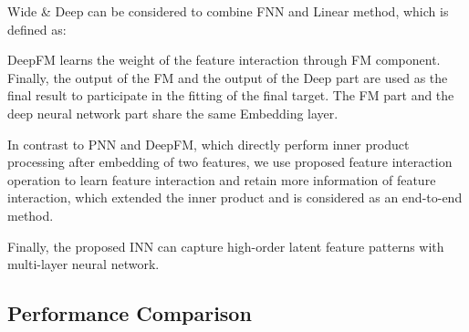 \documentclass[journal]{IEEEtran}
\begin{document}
Wide \& Deep can be considered to combine FNN and Linear method, which is defined as:

DeepFM learns the weight of the feature interaction through FM component. Finally, the output of the FM and the output of the Deep part are used as the final result to participate in the fitting of the final target. The FM part and the deep neural network part share the same Embedding layer.


\begin{table}
\caption{Dataset statistics}
	\label{tab:1}       
\end{table}

In contrast to PNN and DeepFM, which directly perform inner product processing after embedding of two features, we use proposed feature interaction operation to learn feature interaction and retain more information of feature interaction, which extended the inner product and is considered as an end-to-end method.


Finally, the proposed INN can capture high-order latent feature patterns with multi-layer neural network.

\subsection{Performance Comparison}
\begin{table*}[!t]
	\centering
\caption{Overall performance on the Criteo and Avazu datasets}
	\label{tab:2}       
\end{table*}
\end{document}

